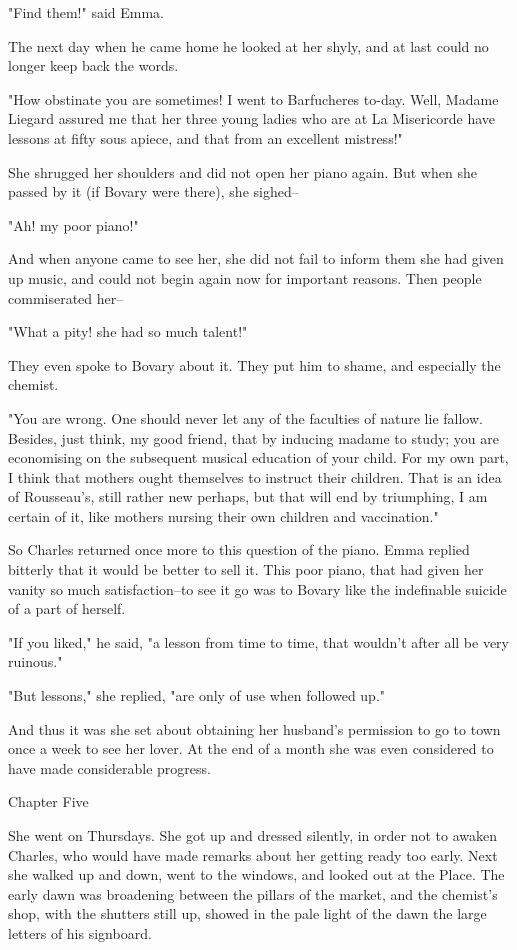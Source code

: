 \documentclass[11pt,twocolumn]{ltugboat}
\begin{document}
"Find them!" said Emma.

The next day when he came home he looked at her shyly, and at last could
no longer keep back the words.

"How obstinate you are sometimes! I went to Barfucheres to-day. Well,
Madame Liegard assured me that her three young ladies who are at
La Misericorde have lessons at fifty sous apiece, and that from an
excellent mistress!"

She shrugged her shoulders and did not open her piano again. But when
she passed by it (if Bovary were there), she sighed--

"Ah! my poor piano!"

And when anyone came to see her, she did not fail to inform them she
had given up music, and could not begin again now for important reasons.
Then people commiserated her--

"What a pity! she had so much talent!"

They even spoke to Bovary about it. They put him to shame, and
especially the chemist.

"You are wrong. One should never let any of the faculties of nature lie
fallow. Besides, just think, my good friend, that by inducing madame to
study; you are economising on the subsequent musical education of
your child. For my own part, I think that mothers ought themselves to
instruct their children. That is an idea of Rousseau's, still rather
new perhaps, but that will end by triumphing, I am certain of it, like
mothers nursing their own children and vaccination."

So Charles returned once more to this question of the piano. Emma
replied bitterly that it would be better to sell it. This poor piano,
that had given her vanity so much satisfaction--to see it go was to
Bovary like the indefinable suicide of a part of herself.

"If you liked," he said, "a lesson from time to time, that wouldn't
after all be very ruinous."

"But lessons," she replied, "are only of use when followed up."

And thus it was she set about obtaining her husband's permission to go
to town once a week to see her lover. At the end of a month she was even
considered to have made considerable progress.



Chapter Five

She went on Thursdays. She got up and dressed silently, in order not to
awaken Charles, who would have made remarks about her getting ready too
early. Next she walked up and down, went to the windows, and looked out
at the Place. The early dawn was broadening between the pillars of the
market, and the chemist's shop, with the shutters still up, showed in
the pale light of the dawn the large letters of his signboard.
\end{document}
